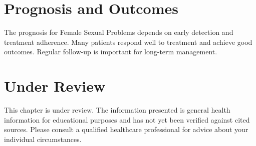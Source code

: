 \section*{Prognosis and Outcomes}
The prognosis for Female Sexual Problems depends on early detection and treatment adherence. Many patients respond well to treatment and achieve good outcomes. Regular follow-up is important for long-term management.
\section*{Under Review}
This chapter is under review. The information presented is general health information for educational purposes and has not yet been verified against cited sources. Please consult a qualified healthcare professional for advice about your individual circumstances.


\clearpage
